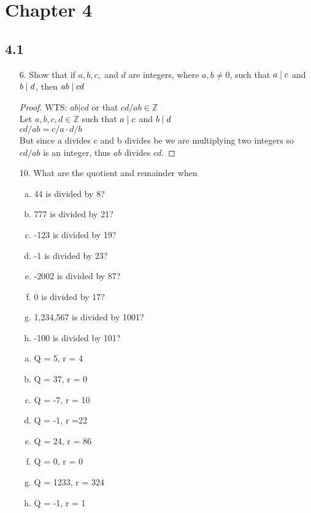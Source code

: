 \section{Chapter 4}
\subsection{4.1}
\begin{itemize}
    \item[6.] Show that if $a, b, c,$ and $d$ are integers, where $a, b \neq 0$, such that $a \mid c$ and $b \mid d$, then $ab \mid cd$\\
          \answer
          \begin{proof}
              WTS: $ab | cd$ or that $cd / ab \in \mathbb{Z}$ \\
              Let $ a, b, c, d \in \mathbb{Z}$ such that $a \mid c$ and $b \mid d$\\
              $cd / ab = c/a \cdot d / b$\\
              But since a divides c and b divides be we are multiplying two integers so $cd / ab$ is an integer, thus $ab$ divides $cd$.
          \end{proof}

    \item[10.] What are the quotient and remainder when
          \begin{enumerate}[a.]
              \item 44 is divided by 8?
              \item 777 is divided by 21?
              \item -123 is divided by 19?
              \item -1 is divided by 23?
              \item -2002 is divided by 87?
              \item 0 is divided by 17?
              \item 1,234,567 is divided by 1001?
              \item -100 is divided by 101?
          \end{enumerate}
          \answer
          \begin{enumerate}[a.]
              \item Q = 5, r = 4
              \item Q = 37, r = 0
              \item Q = -7, r = 10
              \item Q = -1, r =22
              \item Q = 24, r = 86
              \item Q = 0, r = 0
              \item Q = 1233, r = 324
              \item Q = -1, r = 1
          \end{enumerate}


\end{itemize}
